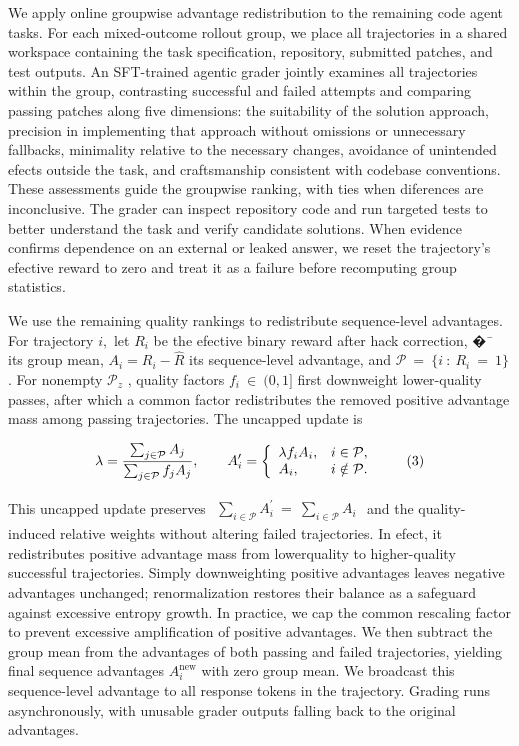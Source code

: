 \documentclass[
  10
]{article}
\newcounter{none} %
\begin{document}
We apply online groupwise advantage redistribution to the remaining code
agent tasks. For each mixed-outcome rollout group, we place all
trajectories in a shared workspace containing the task specification,
repository, submitted patches, and test outputs. An SFT-trained agentic
grader jointly examines all trajectories within the group, contrasting
successful and failed attempts and comparing passing patches along five
dimensions: the suitability of the solution approach, precision in
implementing that approach without omissions or unnecessary fallbacks,
minimality relative to the necessary changes, avoidance of unintended
efects outside the task, and craftsmanship consistent with codebase
conventions. These assessments guide the groupwise ranking, with ties
when diferences are inconclusive. The grader can inspect repository code
and run targeted tests to better understand the task and verify
candidate solutions. When evidence confirms dependence on an external or
leaked answer, we reset the trajectory's efective reward to zero and
treat it as a failure before recomputing group statistics.

We use the remaining quality rankings to redistribute sequence-level
advantages. For trajectory \(i ,\) let \(R _ { i }\) be the efective
binary reward after hack correction, �¯ its group mean,
\(A _ { i } = R _ { i } - \hat { R }\) its sequence-level advantage, and
\(\mathcal { P } \ = \ \{ i \ : \ R _ { i } \ = \ 1 \}\) . For nonempty
\(\mathcal { P } _ { z }\) , quality factors
\(f _ { i } ~ \in ~ ( 0 , 1 ]\) first downweight lower-quality passes,
after which a common factor redistributes the removed positive advantage
mass among passing trajectories. The uncapped update is

\[
\lambda = \frac {\sum_ {j \in \mathcal {P}} A _ {j}}{\sum_ {j \in \mathcal {P}} f _ {j} A _ {j}}, \qquad A _ {i} ^ {\prime} = \left\{ \begin{array}{l l} \lambda f _ {i} A _ {i}, & i \in \mathcal {P}, \\ A _ {i}, & i \notin \mathcal {P}. \end{array} \right.\tag{3}
\]

This uncapped update preserves
\(\begin{array} { r } { \sum _ { i \in \mathcal { P } } A _ { i } ^ { \prime } \ = \ \sum _ { i \in \mathcal { P } } A _ { i } } \end{array}\)
and the quality-induced relative weights without altering failed
trajectories. In efect, it redistributes positive advantage mass from
lowerquality to higher-quality successful trajectories. Simply
downweighting positive advantages leaves negative advantages unchanged;
renormalization restores their balance as a safeguard against excessive
entropy growth. In practice, we cap the common rescaling factor to
prevent excessive amplification of positive advantages. We then subtract
the group mean from the advantages of both passing and failed
trajectories, yielding final sequence advantages
\(A _ { i } ^ { \mathrm { n e w } }\) with zero group mean. We broadcast
this sequence-level advantage to all response tokens in the trajectory.
Grading runs asynchronously, with unusable grader outputs falling back
to the original advantages.
\end{document}
